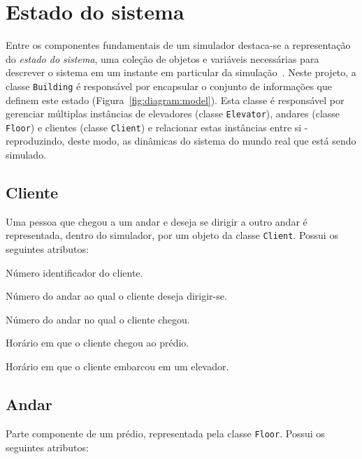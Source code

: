 \section{Estado do sistema}

Entre os componentes fundamentais de um simulador destaca-se a representação do
\textit{estado do sistema}, uma coleção de objetos e variáveis necessárias para
descrever o sistema em um instante em particular da simulação~\cite{Law}. Neste
projeto, a classe \texttt{Building} é responsável por encapsular o conjunto de
informações que definem este estado (Figura~\ref{fig:diagram:model}). Esta
classe é responsável por gerenciar múltiplas instâncias de elevadores (classe
\texttt{Elevator}), andares (classe \texttt{Floor}) e clientes (classe
\texttt{Client}) e relacionar estas instâncias entre si - reproduzindo, deste
modo, as dinâmicas do sistema do mundo real que está sendo simulado.

\subsection{Cliente} \label{model:state:client}
  Uma pessoa que chegou a um andar e deseja se dirigir a outro andar é
  representada, dentro do simulador, por um objeto da classe \texttt{Client}.
  Possui os seguintes atributos:

  \begin{description}[leftmargin=!,labelwidth=\widthof{\bfseries arrivalFloor}]
    \item[\texttt{id}] Número identificador do cliente.
    \item[\texttt{destination}] Número do andar ao qual o cliente deseja dirigir-se.
    \item[\texttt{arrivalFloor}] Número do andar no qual o cliente chegou.
    \item[\texttt{createTime}] Horário em que o cliente chegou ao prédio.
    \item[\texttt{pickupTime}] Horário em que o cliente embarcou em um elevador.
  \end{description}

\subsection{Andar} \label{model:floor}

Parte componente de um prédio, representada pela classe \texttt{Floor}. Possui
os seguintes atributos:

